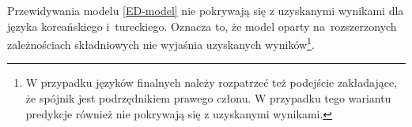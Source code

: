 Przewidywania modelu \eqref{ED-model} nie pokrywają się z uzyskanymi wynikami dla języka koreańskiego i~tureckiego. Oznacza to, że model oparty na~rozszerzonych zależnościach składniowych nie wyjaśnia uzyskanych wyników\footnote{
W przypadku języków finalnych należy rozpatrzeć też podejście zakładające, że spójnik jest podrzędnikiem prawego członu. W przypadku tego wariantu predykcje również nie pokrywają się z uzyskanymi wynikami.}.